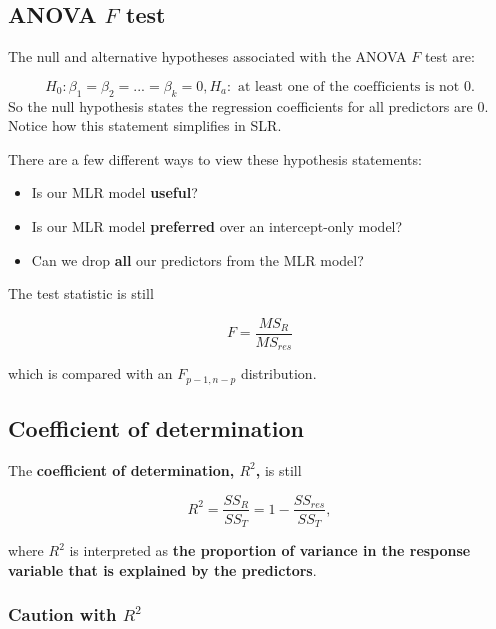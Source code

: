 \documentclass[
]{book}
\providecommand{\tightlist}{%
  \setlength{\itemsep}{0pt}\setlength{\parskip}{0pt}}
\begin{document}
\hypertarget{anova-f-test-1}{%
\subsection{\texorpdfstring{ANOVA \(F\) test}{ANOVA F test}}\label{anova-f-test-1}}

The null and alternative hypotheses associated with the ANOVA \(F\) test are:

\[
H_0: \beta_1=\beta_2=...=\beta_{k}=0, H_a: \text{ at least one of the coefficients is not 0.}
\]
So the null hypothesis states the regression coefficients for all predictors are 0. Notice how this statement simplifies in SLR.

There are a few different ways to view these hypothesis statements:

\begin{itemize}
\tightlist
\item
  Is our MLR model \textbf{useful}?
\item
  Is our MLR model \textbf{preferred} over an intercept-only model?
\item
  Can we drop \textbf{all} our predictors from the MLR model?
\end{itemize}

The test statistic is still

\begin{equation}
F = \frac{MS_R}{MS_{res}}
\label{eq:6ANOVA}
\end{equation}

which is compared with an \(F_{p-1,n-p}\) distribution.

\hypertarget{coefficient-of-determination-1}{%
\subsection{Coefficient of determination}\label{coefficient-of-determination-1}}

The \textbf{coefficient of determination, \(R^2\),} is still

\begin{equation} 
R^{2} = \frac{SS_R}{SS_T} = 1 - \frac{SS_{res}}{SS_T},
\label{eq:6R2}
\end{equation}

where \(R^{2}\) is interpreted as \textbf{the proportion of variance in the response variable that is explained by the predictors}.

\hypertarget{caution-with-r2}{%
\subsubsection{\texorpdfstring{Caution with \(R^2\)}{Caution with R\^{}2}}\label{caution-with-r2}}
\end{document}
